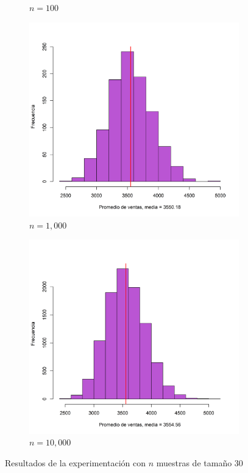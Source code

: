 \documentclass{article}
\begin{document}
\begin{figure}[h]
\begin{center}
\begin{subfigure}[b]{0.45\textwidth}
        \caption{$n=100$}
    \end{subfigure}
        \begin{subfigure}[b]{0.5\textwidth}
        \includegraphics[scale=0.45]{Figures/1000-30.png}
        \caption{$n=1,000$}
    \end{subfigure}
    \begin{subfigure}[b]{0.45\textwidth}
        \includegraphics[scale=0.45]{Figures/10000-30.png}
        \caption{$n=10,000$}
    \end{subfigure}
    \caption{Resultados de la experimentación con $n$ muestras de tamaño $30$}
    \label{con30}
    \end{center}
\end{figure}
\end{document}
